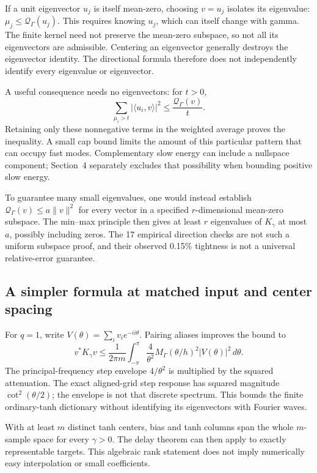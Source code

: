 \documentclass[11pt]{article}
\theoremstyle{definition}
\begin{document}
If a unit eigenvector $u_j$ is itself mean-zero, choosing $v=u_j$ isolates
its eigenvalue: $\mu_j\le\mathcal Q_\Gamma(u_j)$. This requires knowing
$u_j$, which can itself change with gamma. The finite kernel need not
preserve the mean-zero subspace, so not
all its eigenvectors are admissible. Centering an eigenvector generally
destroys the eigenvector identity. The directional formula therefore does
not independently identify every eigenvalue or eigenvector.

A useful consequence needs no eigenvectors: for $t>0$,
\[
\sum_{\mu_i>t}|\langle u_i,v\rangle|^2
\le\frac{\mathcal Q_\Gamma(v)}{t}.
\]
Retaining only these nonnegative terms in the weighted average proves
the inequality. A small cap bound limits the amount of this particular
pattern that can occupy fast modes. Complementary slow energy can include
a nullspace component; Section~4 separately excludes that possibility
when bounding positive slow energy.

To guarantee many small eigenvalues, one would instead establish
$\mathcal Q_\Gamma(v)\le a\|v\|^2$ for every vector in a specified
$r$-dimensional mean-zero subspace. The min--max principle then gives
at least $r$ eigenvalues of $K_\gamma$ at most $a$, possibly including
zeros. The 17 empirical direction checks are not such a uniform subspace
proof, and their observed 0.15\% tightness is not a universal relative-error
guarantee.

\subsection*{A simpler formula at matched input and center spacing}
For $q=1$, write $V(\theta)=\sum_i v_i e^{-ii\theta}$. Pairing aliases
improves the bound to
\[
v^*K_\gamma v\le\frac1{2\pi m}\int_{-\pi}^{\pi}
\frac4{\theta^2}M_\Gamma(\theta/h)^2|V(\theta)|^2\,d\theta.
\]
The principal-frequency step envelope $4/\theta^2$ is multiplied by the
squared attenuation. The exact aligned-grid step response has squared
magnitude $\cot^2(\theta/2)$; the envelope is not that discrete spectrum.
This bounds the finite ordinary-tanh dictionary without identifying its
eigenvectors with Fourier waves.

With at least $m$ distinct tanh centers, bias and tanh columns span the
whole $m$-sample space for every $\gamma>0$. The delay theorem can then
apply to exactly representable targets. This algebraic rank statement
does not imply numerically easy interpolation or small coefficients.
\end{document}
